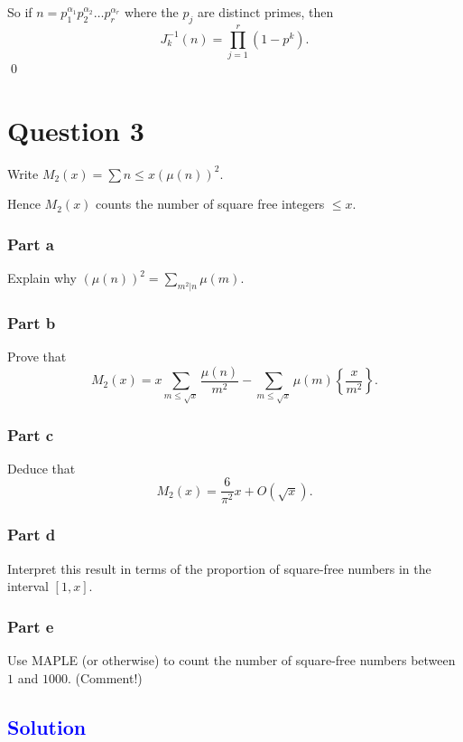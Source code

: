 \documentclass{unswmaths}
\begin{document}
So if $ n = p_1^{\alpha_1} p_2^{\alpha_2} \ldots p_r^{\alpha_r} $ where the $ p_j $ are distinct primes, then
$$
	J_{k}^{-1}(n) = \prod_{j = 1}^{r} \left( 1 - p^k \right).
$$
\qed

\hrulefill

\section*{Question 3}

Write $ M_2(x) = \sum{ n \leq x } (\mu(n))^2 $.

Hence $ M_2(x) $ counts the number of square free integers $ \leq x $.

\subsubsection*{Part a}
Explain why $ (\mu(n))^2 = \sum_{m^2 | n} \mu(m) $.

\subsubsection*{Part b}
Prove that 
$$ 
    M_2(x) = x \sum_{m \leq \sqrt{x}} \frac{\mu(n)}{m^2} - \sum_{m \leq \sqrt{x}} \mu(m) \left\{ \frac{x}{m^2} \right\}.
$$    

\subsubsection*{Part c}
Deduce that 
$$
	M_2(x) = \frac{6}{\pi^2}x + O(\sqrt{x}).
$$

\subsubsection*{Part d}
Interpret this result in terms of the proportion of square-free numbers
in the interval $[ 1, x] $.
\subsubsection*{Part e}
Use MAPLE (or otherwise) to count the number of square-free numbers between $ 1 $ and $ 1000 $. (Comment!)

\hrulefill

\subsection*{\textcolor{blue}{Solution}}
\end{document}
